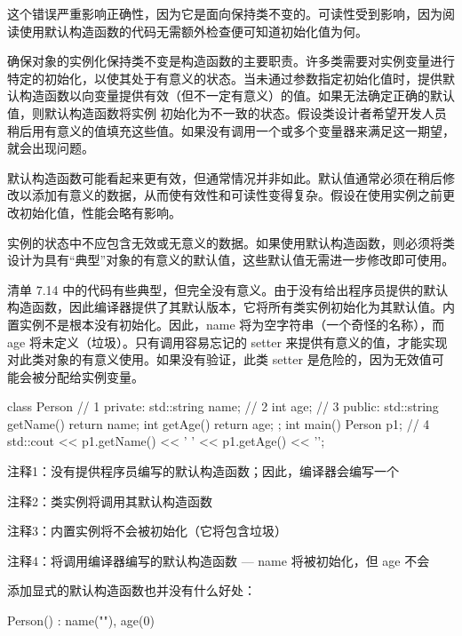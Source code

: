 这个错误严重影响正确性，因为它是面向保持类不变的。可读性受到影响，因为阅读使用默认构造函数的代码无需额外检查便可知道初始化值为何。

确保对象的实例化保持类不变是构造函数的主要职责。许多类需要对实例变量进行特定的初始化，以使其处于有意义的状态。当未通过参数指定初始化值时，提供默认构造函数以向变量提供有效（但不一定有意义）的值。如果无法确定正确的默认值，则默认构造函数将实例 初始化为不一致的状态。假设类设计者希望开发人员稍后用有意义的值填充这些值。如果没有调用一个或多个变量器来满足这一期望，就会出现问题。


默认构造函数可能看起来更有效，但通常情况并非如此。默认值通常必须在稍后修改以添加有意义的数据，从而使有效性和可读性变得复杂。假设在使用实例之前更改初始化值，性能会略有影响。

实例的状态中不应包含无效或无意义的数据。如果使用默认构造函数，则必须将类设计为具有“典型”对象的有意义的默认值，这些默认值无需进一步修改即可使用。

清单 7.14 中的代码有些典型，但完全没有意义。由于没有给出程序员提供的默认构造函数，因此编译器提供了其默认版本，它将所有类实例初始化为其默认值。内置实例不是根本没有初始化。因此，name 将为空字符串（一个奇怪的名称），而age 将未定义（垃圾）。只有调用容易忘记的 setter 来提供有意义的值，才能实现对此类对象的有意义使用。如果没有验证，此类 setter 是危险的，因为无效值可能会被分配给实例变量。


\begin{cpp}
class Person { // 1
private:
  std::string name; // 2
  int age; // 3
public:
  std::string getName() { return name; }
  int getAge() { return age; }
};
int main() {
  Person p1; // 4
  std::cout << p1.getName() << ' ' << p1.getAge() << '\n';
}
\end{cpp}

{\footnotesize
注释1：没有提供程序员编写的默认构造函数；因此，编译器会编写一个

注释2：类实例将调用其默认构造函数

注释3：内置实例将不会被初始化（它将包含垃圾）

注释4：将调用编译器编写的默认构造函数 — name 将被初始化，但 age 不会
}

添加显式的默认构造函数也并没有什么好处：

\begin{cpp}
Person() : name(""), age(0) {}
\end{cpp}

